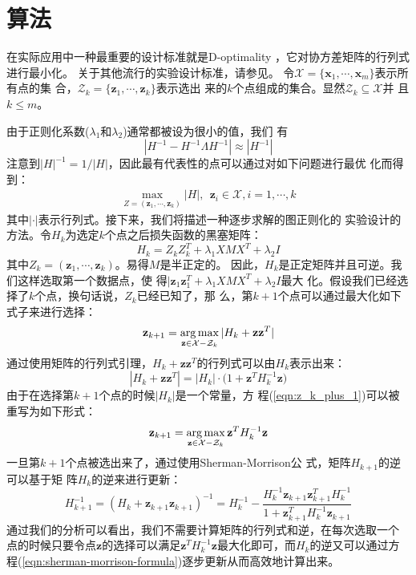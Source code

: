 \section{算法}
\label{sec:algorithm}在实际应用中一种最重要的设计标准就是D-optimality
\cite{optimal-experimental-design}，它对协方差矩阵的行列式进行最小化。
关于其他流行的实验设计标准，请参见\cite{optimal-experimental-design}。
令$\mathcal{X}=\{\textbf{x}_1,\cdots, \mathbf{x}_m \}$表示所有点的集
合，$\mathcal{Z}_k= \{ \mathbf{z}_1, \cdots, \mathbf{z}_k \}$表示选出
来的$k$个点组成的集合。显然$\mathcal{Z}_k \subseteq \mathcal{X}$并
且$k \leq m$。

由于正则化系数($\lambda_1$和$\lambda_2$)通常都被设为很小的值，我们
有
$$
|H^{-1} - H^{-1}\Lambda H^{-1}|\approx |H^{-1}|
$$
注意到$|H|^{-1}=1/|H|$，因此最有代表性的点可以通过对如下问题进行最优
化而得到：
\begin{eqnarray}
\label{eqn:LapDD} \max_{Z=(\mathbf{z}_1, \cdots, \mathbf{z}_k)}| H|,
\ \ \textbf{z}_i \in \mathcal{X}, i=1,\cdots,k
\end{eqnarray}
其中$|\cdot|$表示行列式。接下来，我们将描述一种逐步求解的图正则化的
实验设计的方法。令$H_k$为选定$k$个点之后损失函数的黑塞矩阵：
\begin{equation}\label{eqn:H_k}
H_k=Z_kZ_k^T + \lambda_1 XMX^T + \lambda_2 I
\end{equation}
其中$Z_k= (\mathbf{z}_1, \cdots, \mathbf{z}_k)$。易得$M$是半正定的。
因此，$H_k$是正定矩阵并且可逆。我们这样选取第一个数据点，使
得$|\mathbf{z}_1\mathbf{z}_1^T + \lambda_1 XMX^T + \lambda_2 I$最大
化。假设我们已经选择了$k$个点，换句话说，$Z_k$已经已知了，那
么，第$k+1$个点可以通过最大化如下式子来进行选择：
\begin{equation}\label{eqn:z_k_plus_1}
\textbf{z}_{k+1}=\operatorname*{arg\,max}_{\textbf{z} \in \mathcal{X}-\mathcal{Z}_k}
|H_k + \textbf{z} \textbf{z}^T|
\end{equation}
通过使用矩阵的行列式引理\cite{Matrix-algebra-statistician}，$H_k +
\mathbf{z}\mathbf{z}^T$的行列式可以由$H_k$表示出来：
\begin{equation}
\label{eqn:det_update} |H_k + \textbf{z}
\textbf{z}^T|=|H_k|\cdot\big(1+\textbf{z}^T H_k^{-1} \textbf{z}\big)
\end{equation}
由于在选择第$k+1$个点的时候$|H_k|$是一个常量，方
程(\ref{eqn:z_k_plus_1})可以被重写为如下形式：
\begin{equation}\label{eqn:z-update}
\textbf{z}_{k+1}=\operatorname*{arg\,max}_{\textbf{z} \in \mathcal{X}-\mathcal{Z}_k}
\textbf{z}^T H_k^{-1} \textbf{z}
\end{equation}
一旦第$k+1$个点被选出来了，通过使用Sherman-Morrison公
式\cite{sherman-morrison-formula}，矩阵$H_{k+1}$的逆可以基于矩
阵$H_k$的逆来进行更新：
\begin{equation}\label{eqn:sherman-morrison-formula}
H_{k+1}^{-1}=(H_k + \textbf{z}_{k+1}\textbf{z}_{k+1})^{-1}= H_k^{-1}
- \frac{H_k^{-1}\textbf{z}_{k+1}\textbf{z}_{k+1}^T H_k^{-1}}
{1+\textbf{z}_{k+1}^T H_k^{-1} \textbf{z}_{k+1}}
\end{equation}
通过我们的分析可以看出，我们不需要计算矩阵的行列式和逆，在每次选取一个
点的时候只要令点$\mathbf{z}$的选择可以满足$\mathbf{z}^T H_k^{-1}
\mathbf{z}$最大化即可，而$H_k$的逆又可以通过方
程(\ref{eqn:sherman-morrison-formula})逐步更新从而高效地计算出来。

